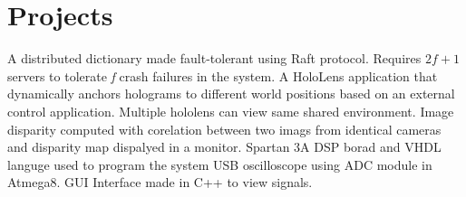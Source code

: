 \section{Projects}
  {A distributed dictionary made fault-tolerant using Raft protocol. Requires $2f+1$ servers to tolerate \textit{f} crash failures in the system.}
  {A HoloLens application that dynamically anchors holograms to different world positions based on an external control application. Multiple hololens can view same shared environment.}
  {Image disparity computed with corelation between two imags from identical cameras and disparity map dispalyed in a monitor. Spartan 3A DSP borad and VHDL languge used to program the system}
  {USB oscilloscope using ADC module in Atmega8. GUI Interface made in C++ to view signals.}
